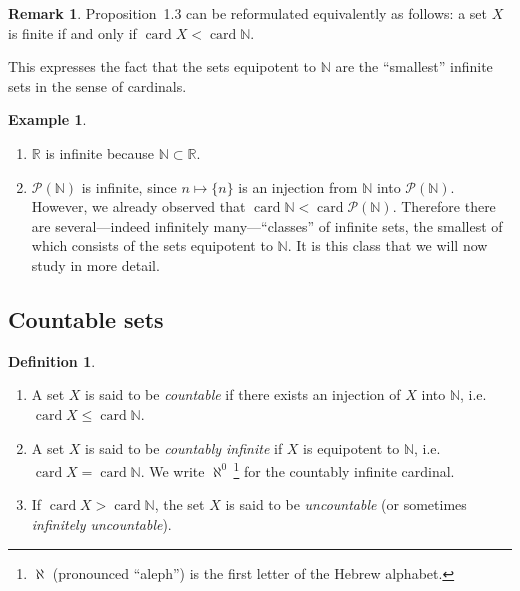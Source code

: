 \documentclass[11pt]{article}
\theoremstyle{definition}
\newtheorem{definition}{Definition}[section]
\newtheorem{example}{Example}[section]
\newtheorem{remark}{Remark}[section]
\begin{document}
\begin{remark}
Proposition~1.3 can be reformulated equivalently as follows:
a set $X$ is finite if and only if $\operatorname{card} X < \operatorname{card}\mathbb N$.
\end{remark}

This expresses the fact that the sets equipotent to $\mathbb N$ are the ``smallest'' infinite sets in the sense of cardinals.

\begin{example}
\begin{enumerate}[leftmargin=2em,label=\arabic*.]
\item $\mathbb R$ is infinite because $\mathbb N\subset\mathbb R$.
\item $\mathcal P(\mathbb N)$ is infinite, since $n\mapsto\{n\}$ is an injection from $\mathbb N$ into $\mathcal P(\mathbb N)$.
However, we already observed that $\operatorname{card}\mathbb N < \operatorname{card}\mathcal P(\mathbb N)$.
Therefore there are several---indeed infinitely many---``classes'' of infinite sets, the smallest of which consists of the sets equipotent to $\mathbb N$.
It is this class that we will now study in more detail.
\end{enumerate}

\end{example}

\subsection{Countable sets}

\begin{definition}
\begin{enumerate}[label=(\alph*),leftmargin=2em]
\item A set $X$ is said to be \emph{countable} if there exists an injection of $X$ into $\mathbb N$, i.e.\ $\operatorname{card} X\le \operatorname{card}\mathbb N$.
\item A set $X$ is said to be \emph{countably infinite} if $X$ is equipotent to $\mathbb N$, i.e.\ $\operatorname{card} X=\operatorname{card}\mathbb N$.
We write $\aleph^0$\,\footnote{$\aleph$ (pronounced ``aleph'') is the first letter of the Hebrew alphabet.} for the countably infinite cardinal.
\item If $\operatorname{card} X > \operatorname{card}\mathbb N$, the set $X$ is said to be \emph{uncountable} (or sometimes \emph{infinitely uncountable}).
\end{enumerate}
\end{definition}
\end{document}
